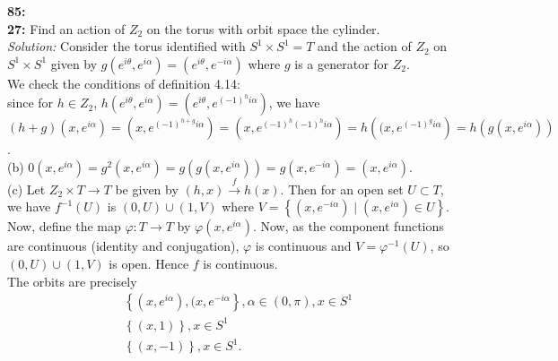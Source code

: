 \documentclass[a4paper]{article}
\begin{document}
        \textbf{85:}\\
        \textbf{27:} Find an action of $Z_2$ on the torus with orbit space the
        cylinder.\\
        \linebreak
        \textit{Solution:} Consider the torus identified with
        $S^{1} \times S^{1} = T$ and the action of $Z_2$ on $S^{1} \times S^{1}$ 
        given
        by $g(e^{i \theta}, e^{i \alpha}) = \left( e^{i \theta}, e^{- i \alpha} \right) $
        where $g$ is a generator for
        $Z_2$.\\
        We check the conditions of definition 4.14:\\
        since for $h \in Z_2$, 
        $h \left( e^{i \theta}, e^{i \alpha} \right) 
        = \left( e^{i \theta}, e^{(-1)^{h} i \alpha} \right) $, we have
        $(h+g) \left( x, e^{i \alpha} \right) 
        = (x, e^{(-1)^{h+g} i \alpha})
        = \left( x, e^{(-1)^{h} (-1)^{h} i \alpha} \right) 
        = h \left( (x, e^{(-1)^{g}i \alpha} \right) 
        = h \left( g \left( x, e^{i \alpha} \right)  \right) $.\\
        \linebreak
        (b) $0 \left( x, e^{i \alpha} \right) 
        = g^2 \left( x, e^{i \alpha} \right) 
        = g \left( g\left( x, e^{i \alpha} \right)  \right) 
        = g \left( x, e^{-i \alpha} \right) 
        = \left( x, e^{i \alpha} \right) $.\\
        \linebreak
        (c) Let $Z_2 \times T \to T$ be given by
        $(h,x) \stackrel{f}{\to } h(x)$. Then
        for an open set $U \subset T$, we have
        $f^{-1}(U)$ is 
        $(0,U) \cup (1,V)$ where
        $V = \left\{ \left( x, e^{- i \alpha} \right)  \mid 
        \left( x, e^{i \alpha} \right) \in U \right\} $.\\
        Now, define the map
        $\varphi  \colon T \to T $ by
        $\varphi \left( x, e^{i \alpha}  \right) $. Now, as the component
        functions are continuous (identity and conjugation), $\varphi$ is
        continuous and $V = \varphi^{-1}(U)$, so
        $(0,U) \cup (1,V)$ is open. Hence
        $f$ is continuous.\\
        \linebreak
        The orbits are precisely
        \begin{align*}
            &\left\{ (x, e^{i \alpha}), (x, e^{- i \alpha} \right\},
            \alpha \in (0, \pi), x \in S^{1} \\
            & \left\{ (x,1) \right\}, x \in S^{1}\\
            & \left\{ (x,-1) \right\}, x \in S^{1}.
        \end{align*}
\end{document}

